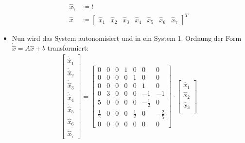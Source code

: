 \begin{itemize}
\begin{align*}
				            \hat{x} _ 7 &\coloneqq t \tag{Autonomisierung} \\
				            \hat{x}     &\coloneqq
					            \begin{bmatrix}
						            \hat{x} _ 1 & \hat{x} _ 2 & \hat{x} _ 3 & \hat{x} _ 4 & \hat{x} _ 5 & \hat{x} _ 6 & \hat{x} _ 7
					            \end{bmatrix} ^ T
			            \end{align*}
			        \item Nun wird das System autonomisiert und in ein System 1. Ordnung der Form \( \dot{\hat{x}} = A \hat{x} + b \) transformiert:
				        \begin{align*}
					        \begin{bmatrix}
						        \dot{\hat{x}} _ 1 \\
						        \dot{\hat{x}} _ 2 \\
						        \dot{\hat{x}} _ 3 \\
						        \dot{\hat{x}} _ 4 \\
						        \dot{\hat{x}} _ 5 \\
						        \dot{\hat{x}} _ 6 \\
						        \dot{\hat{x}} _ 7
					        \end{bmatrix}
					        =
					        \begin{bmatrix}
					        	0           & 0 & 0 & 1 & 0           & 0            & 0            \\
					        	0           & 0 & 0 & 0 & 1           & 0            & 0            \\
					        	0           & 0 & 0 & 0 & 0           & 1            & 0            \\
					        	0           & 3 & 0 & 0 & 0           & -1           & -1           \\
					        	5           & 0 & 0 & 0 & 0           & -\frac{1}{2} & 0            \\
					        	\frac{1}{2} & 0 & 0 & 0 & \frac{1}{2} & 0            & -\frac{2}{5} \\
					        	0           & 0 & 0 & 0 & 0           & 0            & 0
					        \end{bmatrix}
					        \cdot
					        \begin{bmatrix}
						        \hat{x} _ 1 \\
						        \hat{x} _ 2 \\
						        \hat{x} _ 3 \\

\end{bmatrix}
\end{align*}
\end{itemize}
